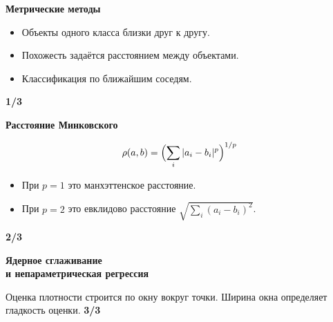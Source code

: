 \documentclass{article}
\newcommand{\slidetitle}[1]{{\fontsize{14.3}{17}\selectfont\bfseries #1\par}\vspace{14pt}}
\newcommand{\slidenum}[1]{\vfill{\hfill\fontsize{10}{12}\selectfont\bfseries #1/3}}
\begin{document}
\slidetitle{Метрические методы}
\begin{itemize}
  \item[$\bullet$] Объекты одного класса близки друг к другу.
  \item[$\bullet$] Похожесть задаётся расстоянием между объектами.
  \item[$\bullet$] Классификация по ближайшим соседям.
\end{itemize}
\slidenum{1}
\newpage

\slidetitle{Расстояние Минковского}
\[
  \rho(a, b) = \Bigl(\sum_{i} |a_i - b_i|^p\Bigr)^{1/p}
\]
\begin{itemize}
  \item[$\bullet$] При $p = 1$ это манхэттенское расстояние.
  \item[$\bullet$] При $p = 2$ это евклидово расстояние $\sqrt{\sum_i (a_i - b_i)^2}$.
\end{itemize}
\slidenum{2}
\newpage

\slidetitle{Ядерное сглаживание\\и непараметрическая регрессия}
Оценка плотности строится по окну вокруг точки.
Ширина окна определяет гладкость оценки.
\slidenum{3}
\end{document}
